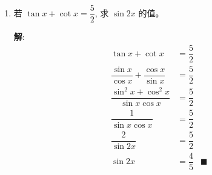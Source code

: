 \documentclass{report}
\newcommand{\sol}{\vspace{0.2cm}\textbf{解}:}
\begin{document}
\begin{enumerate}[leftmargin=*]
        \sol{}
        \begin{align*}
            \tan \dfrac{\theta}{2} \tan \left(\dfrac{\theta}{2}-\dfrac{\pi}{4}\right) &= \dfrac{1 - \cos\theta}{\sin\theta} \cdot \dfrac{\tan\dfrac{\theta}{2} - 1}{1 + \tan\dfrac{\theta}{2}}\\
            &= \dfrac{1 - \cos\theta}{\sin\theta} \cdot \dfrac{\dfrac{\sin\theta}{1 + \cos\theta} - 1}{1 + \dfrac{\sin\theta}{1 + \cos\theta}}\\
            &= \dfrac{1 - \cos\theta}{\sin\theta} \cdot \dfrac{\sin\theta - 1 - \cos\theta}{1 + \sin\theta + \cos\theta}\\
            &= -\dfrac{1 - \cos\theta}{\sin\theta} \cdot \dfrac{1 - \sin\theta + \cos\theta}{1 + \sin\theta + \cos\theta}\\
            &= -\dfrac{(1 - \cos\theta)(1 - \sin\theta + \cos\theta)}{\sin\theta(1 + \sin\theta + \cos\theta)}\\
            &= -\dfrac{(1 - \sin\theta + \cos\theta - \cos\theta + \sin\theta\cos\theta - \cos^2\theta)}{\sin\theta(1 + \sin\theta + \cos\theta)}\\
            &= -\dfrac{1 - \sin\theta + \sin\theta\cos\theta - \cos^2\theta}{\sin\theta(1 + \sin\theta + \cos\theta)}\\
            &= -\dfrac{1 - \sin\theta + \sin\theta\cos\theta - 1 + \sin^2\theta}{\sin\theta(1 + \sin\theta + \cos\theta)}\\
            &= -\dfrac{- \sin\theta + \sin\theta\cos\theta + \sin^2\theta}{\sin\theta(1 + \sin\theta + \cos\theta)}\\
            &= -\dfrac{- 1 + \cos\theta + \sin\theta}{1 + \sin\theta + \cos\theta}\\
            &= \dfrac{1 - \sin\theta - \cos\theta}{1 + \sin\theta + \cos\theta} & \blacksquare
        \end{align*}
        
        \item 若 $\tan x+\cot x=\dfrac{5}{2}$, 求 $\sin 2 x$ 的值。
        
        \sol{}
        \begin{align*}
            \tan x + \cot x &= \dfrac{5}{2}\\
            \dfrac{\sin x}{\cos x} + \dfrac{\cos x}{\sin x} &= \dfrac{5}{2}\\
            \dfrac{\sin^2 x + \cos^2 x}{\sin x\cos x} &= \dfrac{5}{2}\\
            \dfrac{1}{\sin x\cos x} &= \dfrac{5}{2}\\
            \dfrac{2}{\sin 2x} &= \dfrac{5}{2}\\
            \sin 2x &= \dfrac{4}{5} & \blacksquare
        \end{align*}


\end{enumerate}
\end{document}
